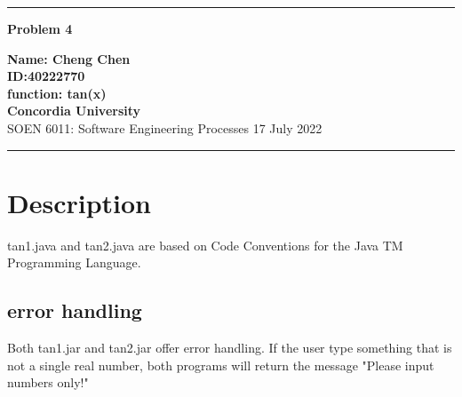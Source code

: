 \documentclass[10pt,a4paper,twoside]{article}
\begin{document}
\begin{center}
\hrule

\vspace{.4cm}
{\bf {\Huge Problem 4}}
\vspace{.2cm}
\end{center}
{\bf Name: Cheng Chen}  \\
{\bf ID:40222770}\\
{\bf function: tan(x)}\\
{\bf Concordia University}\\
SOEN 6011: Software Engineering Processes {\bf  } \hspace{\fill}  17 July  2022 \\
\hrule






\section{Description}
tan1.java and tan2.java are based on Code Conventions for the Java TM Programming Language.\cite{ref1}
\subsection{error handling}
    Both tan1.jar and tan2.jar offer error handling. If the user type something that is not a single real number, both programs will return the message "Please input numbers only!"
\end{document}
